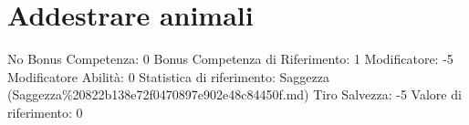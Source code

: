\section{Addestrare animali}\label{addestrare-animali}

\begin{description}
\tightlist
\item[Tags: ABI]
No Bonus Competenza: 0 Bonus Competenza di Riferimento: 1 Modificatore:
-5 Modificatore Abilità: 0 Statistica di riferimento: Saggezza
(Saggezza\%20822b138e72f0470897e902e48c84450f.md) Tiro Salvezza: -5
Valore di riferimento: 0
\end{description}
